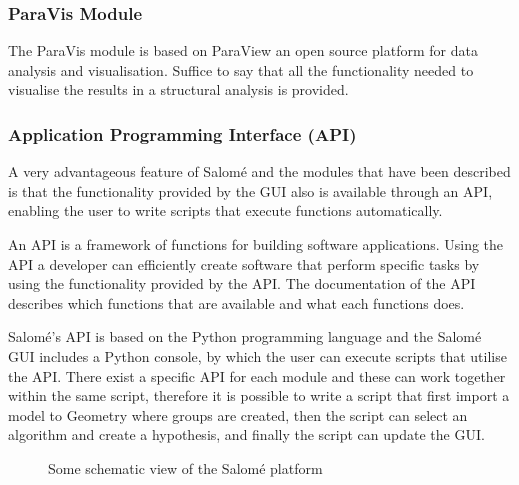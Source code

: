 \subsubsection{ParaVis Module} %
\label{ssub:paravis_module}
The ParaVis module is based on ParaView an open source platform for data analysis and visualisation. Suffice to say that all the functionality needed to visualise the results in a structural analysis is provided.

\subsubsection{Application Programming Interface (API)} %
\label{ssub:application_programming_interface_}
A very advantageous feature of Salomé and the modules that have been described is that the functionality provided by the GUI also is available through an API, enabling the user to write scripts that execute functions automatically.

An API is a framework of functions for building software applications. Using the API a developer can efficiently create software that perform specific tasks by using the functionality provided by the API. The documentation of the API describes which functions that are available and what each functions does.

Salomé's API is based on the Python programming language and the Salomé GUI includes a Python console, by which the user can execute scripts that utilise the API. There exist a specific API for each module and these can work together within the same script, therefore it is possible to write a script that first import a model to Geometry where groups are created, then the script can select an algorithm and create a hypothesis, and finally the script can update the GUI.

\begin{figure}[t]
	\begin{center}
	\end{center}
	\caption{Some schematic view of the Salomé platform}
	\label{fig:salome}
\end{figure}



